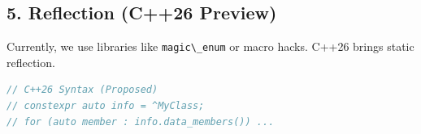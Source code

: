 \hypertarget{reflection-c26-preview}{%
\subsection{5. Reflection (C++26
Preview)}\label{reflection-c26-preview}}

Currently, we use libraries like \passthrough{\lstinline!magic\_enum!}
or macro hacks. C++26 brings static reflection.

\begin{lstlisting}[language={C++}]
// C++26 Syntax (Proposed)
// constexpr auto info = ^MyClass;
// for (auto member : info.data_members()) ...
\end{lstlisting}
